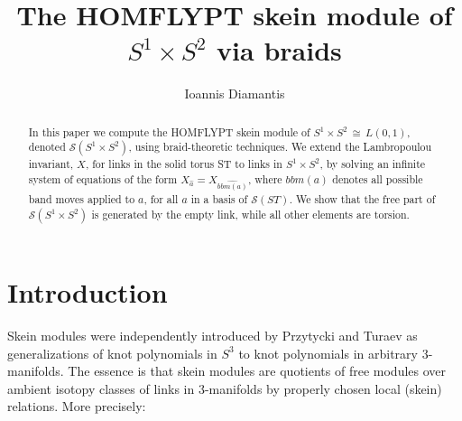 \documentclass[11pt]{amsart}
\begin{document}
\title[The HOMFLYPT skein module of $S^1 \times S^2$ via braids]
  {The HOMFLYPT skein module of $S^1 \times S^2$ via braids}

\author{Ioannis Diamantis}
\address{Department of Data Analytics and Digitalisation,
Maastricht University, School of Business and Economics,
P.O.Box 616, 6200 MD, Maastricht,
The Netherlands.
}




\setcounter{section}{-1}

\date{}


\begin{abstract}
In this paper we compute the HOMFLYPT skein module of $S^1 \times S^2\, \cong
\, L(0, 1)$, denoted $\mathcal{S}(S^1 \times S^2)$, using braid-theoretic techniques. We extend the Lambropoulou invariant, $X$, for links in the solid torus ST to links in $S^1 \times S^2$, by solving an infinite system of equations of the form $X_{\widehat{a}} = X_{\widehat{bbm(a)}}$, where $bbm(a)$ denotes all possible band moves applied to $a$, for all $a$ in a basis of $\mathcal{S}(ST)$. We show that the free part of $\mathcal{S}(S^1 \times S^2)$ is generated by the empty link, while all other elements are torsion. 
\end{abstract}



\maketitle




\section{Introduction}

Skein modules were independently introduced by Przytycki \cite{P} and Turaev \cite{Tu} as generalizations of knot polynomials in $S^3$ to knot polynomials in arbitrary 3-manifolds. The essence is that skein modules are quotients of free modules over ambient isotopy classes of links in 3-manifolds by properly chosen local (skein) relations. More precisely:
\end{document}
